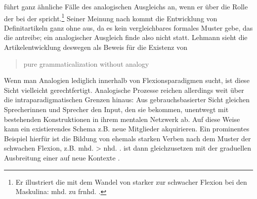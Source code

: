 \textcite[160]{Lehmann2004} führt ganz ähnliche Fälle des analogischen Ausgleichs an, wenn er über die Rolle der  bei der  spricht.\footnote{Er illustriert die  mit dem  Wandel von starker zur schwacher Flexion bei den Maskulina: mhd.  zu frnhd. .} Seiner Meinung nach kommt die Entwicklung von Definitartikeln ganz ohne  aus, da es kein vergleichbares formales Muster gebe, das die   antreibe; ein analogischer Ausgleich  finde also nicht statt. Lehmann sieht die Artikelentwicklung deswegen als Beweis für die Existenz von \blockcquote[161]{Lehmann2004}{pure grammaticalization without analogy}. 

Wenn man Analogien  lediglich innerhalb von Flexionsparadigmen sucht, ist diese Sicht vielleicht gerechtfertigt. Analogische Prozesse  reichen allerdings weit über die intraparadigmatischen Grenzen hinaus: Aus gebrauchsbasierter Sicht gleichen Sprecherinnen und Sprecher den Input, den sie bekommen, unentwegt mit bestehenden Konstruktionen in ihrem mentalen Netzwerk ab. Auf diese Weise kann ein existierendes Schema z.B. neue Mitglieder akquirieren. Ein prominentes Beispiel hierfür ist die Bildung von ehemals starken Verben nach dem Muster der schwachen Flexion, z.B. mhd.  > nhd.  \parencite{Bittner1985}.  ist dann gleichzusetzen mit der graduellen Ausbreitung einer   auf neue Kontexte \parencite[57--58]{Bybee2010}. %

